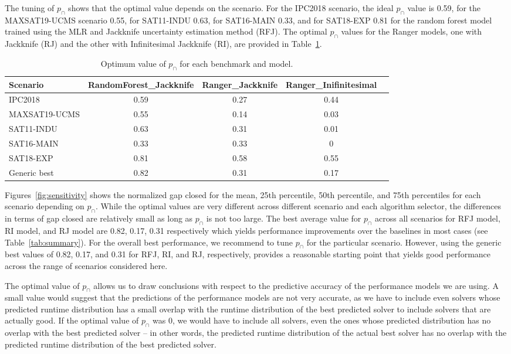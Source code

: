 The tuning of $p_{\cap}$ shows that the optimal value depends on the scenario. For the IPC2018 scenario, the ideal $p_{\cap}$ value is 0.59, for the MAXSAT19-UCMS scenario 0.55, for SAT11-INDU 0.63, for SAT16-MAIN 0.33, and for SAT18-EXP 0.81 for the random forest model trained using the MLR and Jackknife uncertainty estimation method (RFJ). The optimal $p_{\cap}$ values for the Ranger models, one with Jackknife (RJ) and the other with Infinitesimal Jackknife (RI), are provided in Table~\ref{tab:pcap}.

\begin{table}
\centering
\caption{Optimum value of $p_{\cap}$ for each benchmark and model.}
\label{tab:pcap}
\begin{tabular}{p{3.6cm} cccc}
\toprule
Scenario & RandomForest\_Jackknife & Ranger\_Jackknife & Ranger\_Inifinitesimal\\
\midrule
IPC2018 & 0.59 & 0.27 & 0.44 \\
MAXSAT19-UCMS & 0.55 & 0.14 & 0.03\\
SAT11-INDU & 0.63 & 0.31 & 0.01\\
SAT16-MAIN & 0.33 & 0.33 & 0\\
SAT18-EXP & 0.81 & 0.58 & 0.55\\
\midrule
Generic best & 0.82 & 0.31 & 0.17\\
\bottomrule
\end{tabular}
\end{table}


Figures~\ref{fig:sensitivity} shows the normalized gap closed for the mean, 25th percentile, 50th percentile, and 75th percentiles for each scenario depending on $p_{\cap}$. While the optimal values are very different across different scenario and each algorithm selector, the differences in terms of gap closed are relatively small as long as $p_{\cap}$ is not too large. The best average value for $p_{\cap}$ across all scenarios for RFJ model, RI model, and RJ model are 0.82, 0.17, 0.31 respectively which yields performance improvements over the baselines in most cases (see Table~\ref{tab:summary}). For the overall best performance, we recommend to tune $p_{\cap}$ for the particular scenario. However, using the generic best values of 0.82, 0.17, and 0.31 for RFJ, RI, and RJ, respectively, provides a reasonable starting point that yields good performance across the range of scenarios considered here.

The optimal value of $p_{\cap}$ allows us to draw conclusions with respect to the predictive accuracy of the performance models we are using. A small value would suggest that the predictions of the performance models are not very accurate, as we have to include even solvers whose predicted runtime distribution has a small overlap with the runtime distribution of the best predicted solver to include solvers that are actually good. If the optimal value of $p_{\cap}$ was 0, we would have to include all solvers, even the ones whose predicted distribution has no overlap with the best predicted solver -- in other words, the predicted runtime distribution of the actual best solver has no overlap with the predicted runtime distribution of the best predicted solver. 

